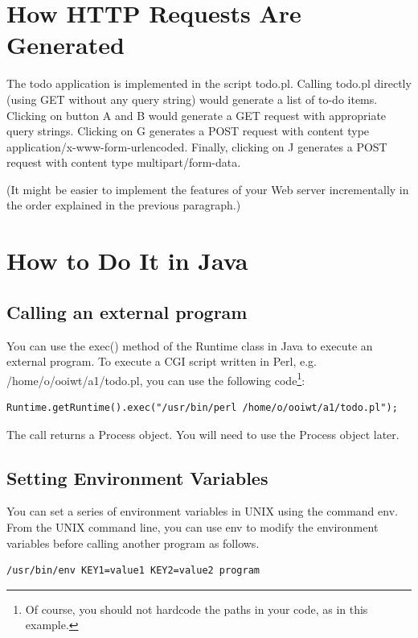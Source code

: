 \documentclass[a4paper,11pt]{exam}
\begin{document}
\section*{How HTTP Requests Are Generated}

The todo application is implemented in the script todo.pl. Calling todo.pl directly (using GET without any query string) would generate a list of to-do items. Clicking on button A and B would generate a GET request with appropriate query strings. Clicking on G generates a POST request with content type application/x-www-form-urlencoded. Finally, clicking on J generates a POST request with content type multipart/form-data.

(It might be easier to implement the features of your Web server incrementally in the order explained in the previous paragraph.)

\section*{How to Do It in Java}

\subsection*{Calling an external program}

You can use the exec() method of the Runtime class in Java to execute an external program. To execute a CGI script written in Perl, e.g. /home/o/ooiwt/a1/todo.pl, you can use the following code\footnote{Of course, you should not hardcode the paths in your code, as in this example.}:

\begin{verbatim}
Runtime.getRuntime().exec("/usr/bin/perl /home/o/ooiwt/a1/todo.pl");
\end{verbatim}

The call returns a Process object. You will need to use the Process object later.

\subsection*{Setting Environment Variables}

You can set a series of environment variables in UNIX using the command env. From the UNIX command line, you can use env to modify the environment variables before calling another program as follows.

\begin{verbatim}
/usr/bin/env KEY1=value1 KEY2=value2 program
\end{verbatim}
\end{document}
